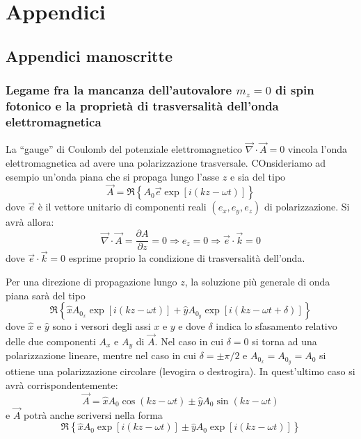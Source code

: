 \part{Appendici}
\chapter{Appendici manoscritte}
\section{Legame fra la mancanza dell'autovalore $m_z=0$ di spin fotonico e la
proprietà di trasversalità dell'onda elettromagnetica}
\label{sec:autovalore0fotone}
La ``gauge'' di Coulomb del potenziale elettromagnetico
$\vec{\nabla}\cdot \vec{A} = 0$ vincola l'onda elettromagnetica ad avere una
polarizzazione trasversale. COnsideriamo ad esempio un'onda piana che si propaga
lungo l'asse $z$ e sia del tipo
\begin{equation}
  \vec{A} = \Re\left\{A_0\vec{e}\exp\left[ i\left( kz-\omega t \right)
  \right]\right\}
\end{equation}
dove $\vec{e}$ è il vettore unitario di componenti reali $(e_x,e_y,e_z)$ di
polarizzazione. Si avrà allora:
\[
  \vec{\nabla}\cdot\vec{A} = \frac{\partial A}{\partial z}= 0 \Rightarrow e_z =
  0\Rightarrow \vec{e}\cdot\vec{k} = 0
\]
dove $\vec{e}\cdot\vec{k}=0$ esprime proprio la condizione di trasversalità
dell'onda.

Per una direzione di propagazione lungo $z$, la soluzione più generale di onda
piana sarà del tipo
\begin{equation}
  \Re\left\{ \hat{x}A_{0_x}\exp\left[ i\left( kz-\omega t \right) \right] +
  \hat{y}A_{0_y}\exp\left[ i\left( kz - \omega t + \delta \right) \right] \right\}
\end{equation}
dove $\hat{x}$ e $\hat{y}$ sono i versori degli assi $x$ e $y$ e dove $\delta$
indica lo sfasamento relativo delle due componenti $A_x$ e $A_y$ di $\vec{A}$.
Nel caso in cui $\delta=0$ si torna ad una polarizzazione lineare, mentre nel
caso in cui $\delta=\pm\pi/2$ e $A_{0_x}=A_{0_y}=A_0$ si ottiene una
polarizzazione circolare (levogira o destrogira). In quest'ultimo caso si avrà
corrispondentemente:
\begin{equation}
  \vec{A} = \hat{x}A_0\cos\left( kz-\omega t \right) \pm \hat{y}A_0\sin\left(
  kz-\omega t \right)
\end{equation}
e $\vec{A}$ potrà anche scriversi nella forma
\[
  \Re\left\{ \hat{x}A_{0}\exp\left[ i\left( kz-\omega t \right) \right] \pm
  \hat{y}A_{0}\exp\left[ i\left( kz - \omega t \right) \right] \right\}
\]

